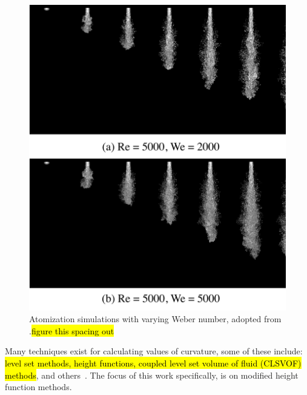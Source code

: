  \begin{figure}[htbp]
	\centering
	\includegraphics[width=5.0in]{figs/surf}
	\caption{Atomization simulations with varying Weber number, adopted from \cite{Desjardins13}.\hl{figure this spacing out}}
	\label{fig:surf}
\end{figure}

Many techniques exist for calculating values of curvature, some of these include:  \hl{level set methods,  height functions, coupled level set volume of fluid (CLSVOF) methods}, and others~\cite{1,2,3,4}. The focus of this work specifically, is on modified height function methods.


